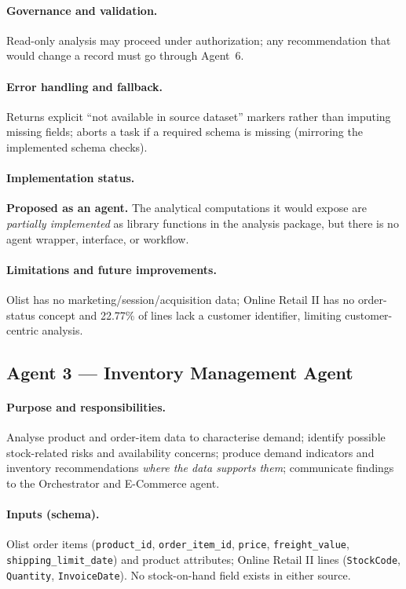 \documentclass[11pt,a4paper]{article}
\newcommand{\code}[1]{\texttt{#1}}
\begin{document}
\paragraph{Governance and validation.} Read-only analysis may proceed under authorization; any recommendation that would change a record must go through Agent~6.

\paragraph{Error handling and fallback.} Returns explicit ``not available in source dataset'' markers rather than imputing missing fields; aborts a task if a required schema is missing (mirroring the implemented schema checks).

\paragraph{Implementation status.} \textbf{Proposed as an agent.} The analytical computations it would expose are \emph{partially implemented} as library functions in the analysis package, but there is no agent wrapper, interface, or workflow.

\paragraph{Limitations and future improvements.} Olist has no marketing/session/acquisition data; Online Retail II has no order-status concept and 22.77\% of lines lack a customer identifier, limiting customer-centric analysis.

\subsection{Agent 3 --- Inventory Management Agent}
\paragraph{Purpose and responsibilities.} Analyse product and order-item data to characterise demand; identify possible stock-related risks and availability concerns; produce demand indicators and inventory recommendations \emph{where the data supports them}; communicate findings to the Orchestrator and E-Commerce agent.

\paragraph{Inputs (schema).} Olist order items (\code{product\_id}, \code{order\_item\_id}, \code{price}, \code{freight\_value}, \code{shipping\_limit\_date}) and product attributes; Online Retail II lines (\code{StockCode}, \code{Quantity}, \code{InvoiceDate}). No stock-on-hand field exists in either source.
\end{document}
